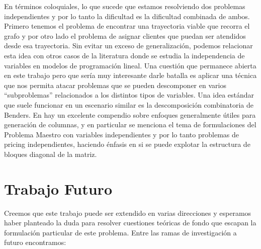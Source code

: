 En términos coloquiales, lo que sucede que estamos resolviendo dos problemas independientes y por lo tanto la dificultad es la dificultad combinada de ambos. Primero tenemos el problema de encontrar una trayectoria viable que recorra el grafo y por otro lado el problema de asignar clientes que puedan ser atendidos desde esa trayectoria. Sin evitar un exceso de generalización, podemos relacionar esta idea con otros casos de la literatura donde se estudia la independencia de variables en modelos de programación lineal. Una cuestión que permanece abierta en este trabajo pero que sería muy interesante darle batalla es aplicar una técnica que nos permita atacar problemas que se pueden descomponer en varios ``subproblemas'' relacionados a los distintos tipos de variables. Una idea estándar que suele funcionar en un escenario similar es la descomposición combinatoria de Benders. En \cite{desrosiers2005primer} hay un excelente compendio sobre enfoques generalmente útiles para generación de columnas, y en particular se menciona el tema de formulaciones del Problema Maestro con variables independientes y por lo tanto problemas de pricing independientes, haciendo énfasis en si se puede explotar la estructura de bloques diagonal de la matriz. 


\section{Trabajo Futuro}

Creemos que este trabajo puede ser extendido en varias direcciones y esperamos haber planteado la duda para resolver cuestiones teóricas de fondo que escapan la formulación particular de este problema. Entre las ramas de investigación a futuro encontramos:

